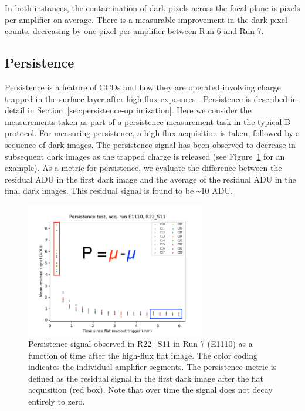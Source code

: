 In both instances, the contamination of dark pixels across the focal plane is  pixels per amplifier on average. There is a measurable improvement in the dark pixel counts, decreasing by one pixel per amplifier between Run 6 and Run 7.

\subsection{Persistence}\label{initPersistenceChar}

Persistence is a feature of CCDs and how they are operated involving charge trapped in the
surface layer after high-flux exposures \citep{dmtn-276,2024SPIE13103E..0WU}.
Persistence is described in detail in Section~\ref{sec:persistence-optimization}.
Here we consider the measurements taken as
part of a persistence measurement task in the typical B protocol. For
measuring persistence, a high-flux acquisition is taken, followed by a
sequence of dark images. The persistence signal has been observed to
decrease in subsequent dark images as the trapped charge is released (see Figure~\ref{fig:persistence-decay} for an example). As a metric for persistence,
we evaluate the difference between the residual ADU in the first dark
image and the average of the residual ADU in the final dark images. This residual signal is found to be \textasciitilde10 ADU.

\begin{figure}[H]
\begin{centering}
\includegraphics[width=0.7\textwidth]{figures/baselineCharacterization/persistence_plot_LSSTCam_R22_S11_u_lsstccs_eo_persistence_E1110_w_2024_35_20240926T235141Z.png}
\caption{Persistence signal observed in R22\_S11 in Run 7 (E1110) as a function of time after the high-flux flat image.  The color coding indicates the individual amplifier segments.  The persistence metric is defined as the residual signal in the first dark image after the flat acquisition (red box).  Note that over time the signal does not decay entirely to zero.}
\label{fig:persistence-decay}
\end{centering}
\end{figure}

